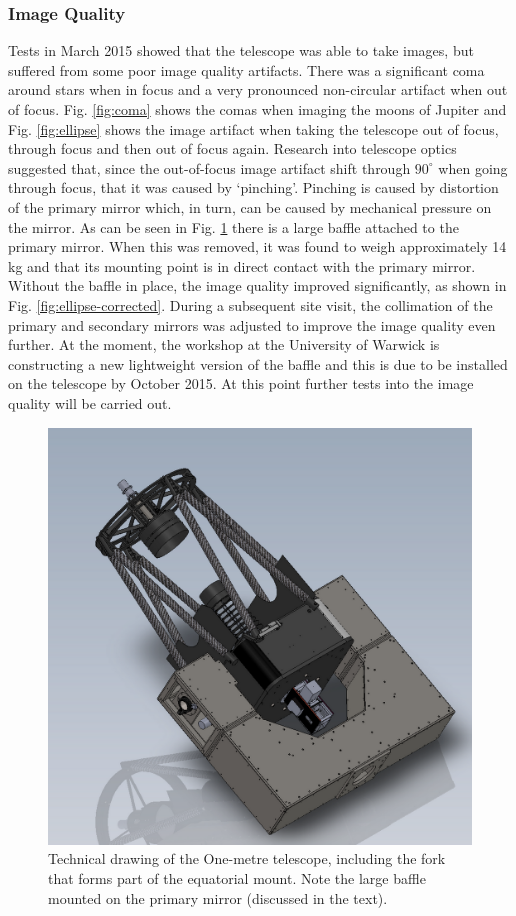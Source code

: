 \documentclass[a4paper,fleqn,usenatbib]{mnras}
\begin{document}
\subsubsection{Image Quality}
Tests in March 2015 showed that the telescope was able to take images, but suffered from some poor image quality artifacts. There was a significant coma around stars when in focus and a very pronounced non-circular artifact when out of focus. Fig. \ref{fig:coma} shows the comas when imaging the moons of Jupiter and Fig. \ref{fig:ellipse} shows the image artifact when taking the telescope out of focus, through focus and then out of focus again. Research into telescope optics suggested that, since the out-of-focus image artifact shift through $90^\circ$ when going through focus, that it was caused by `pinching'. Pinching is caused by distortion of the primary mirror which, in turn, can be caused by mechanical pressure on the mirror. As can be seen in Fig. \ref{fig:telescope} there is a large baffle attached to the primary mirror. When this was removed, it was found to weigh approximately 14 kg and that its mounting point is in direct contact with the primary mirror. Without the baffle in place, the image quality improved significantly, as shown in Fig. \ref{fig:ellipse-corrected}. During a subsequent site visit, the collimation of the primary and secondary mirrors was adjusted to improve the image quality even further. At the moment, the workshop at the University of Warwick is constructing a new lightweight version of the baffle and this is due to be installed on the telescope by October 2015. At this point further tests into the image quality will be carried out.  

\begin{figure}
	\includegraphics[width=\columnwidth]{images/telescope.png}
    \caption{Technical drawing of the One-metre telescope, including the fork that forms part of the equatorial mount.  Note the large baffle mounted on the primary mirror (discussed in the text).}
    \label{fig:telescope}
\end{figure}
\end{document}
